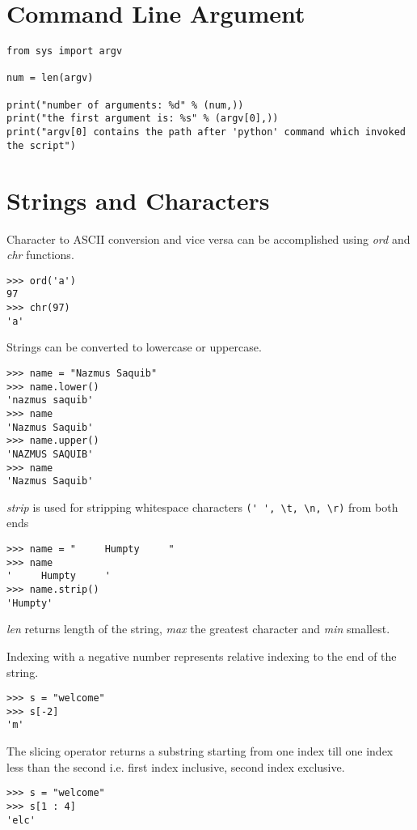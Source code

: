 \documentclass[a4paper, 12pt]{article}
\begin{document}
\section{Command Line Argument}
\begin{verbatim}
from sys import argv

num = len(argv)

print("number of arguments: %d" % (num,))
print("the first argument is: %s" % (argv[0],))
print("argv[0] contains the path after 'python' command which invoked the script")
\end{verbatim}

\section{Strings and Characters}
Character to ASCII conversion and vice versa can be accomplished using \emph{ord} and \emph{chr} functions.
\begin{verbatim}
>>> ord('a')
97
>>> chr(97)
'a'
\end{verbatim}

Strings can be converted to lowercase or uppercase.
\begin{verbatim}
>>> name = "Nazmus Saquib"
>>> name.lower()
'nazmus saquib'
>>> name
'Nazmus Saquib'
>>> name.upper()
'NAZMUS SAQUIB'
>>> name
'Nazmus Saquib'
\end{verbatim}

\emph{strip} is used for stripping whitespace characters \verb|(' ', \t, \n, \r)| from both ends
\begin{verbatim}
>>> name = "     Humpty     "
>>> name
'     Humpty     '
>>> name.strip()
'Humpty'
\end{verbatim}

\emph{len} returns length of the string, \emph{max} the greatest character and \emph{min} smallest.

Indexing with a negative number represents relative indexing to the end of the string.
\begin{verbatim}
>>> s = "welcome"
>>> s[-2]
'm'
\end{verbatim}

The slicing operator returns a substring starting from one index till one index less than the second i.e. first index inclusive, second index exclusive.
\begin{verbatim}
>>> s = "welcome"
>>> s[1 : 4]
'elc'
\end{verbatim}
\end{document}

